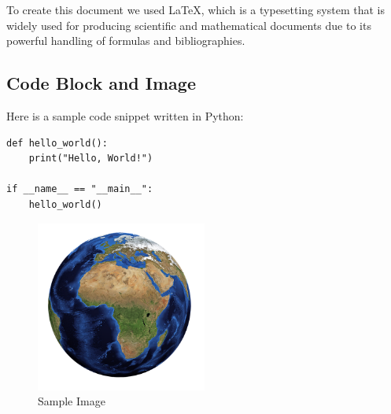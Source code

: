 \documentclass{article}
\begin{document}
\noindent
To create this document we used LaTeX,
which is a typesetting system that is widely used for
producing scientific and mathematical documents due to
its powerful handling of formulas and bibliographies.

\newpage

\subsection{Code Block and Image}
Here is a sample code snippet written in Python:

\begin{verbatim}
def hello_world():
    print("Hello, World!")

if __name__ == "__main__":
    hello_world() 
\end{verbatim}

\begin{figure}[H]
    \centering
    \includegraphics[width=0.5\textwidth]{earth.png} %
    \caption{Sample Image}
    \label{fig:sample_image}
\end{figure}
\end{document}
